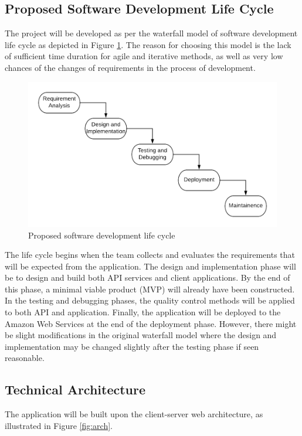 \documentclass[12pt, a4paper, oneside]{article}
\begin{document}
\subsection{Proposed Software Development Life Cycle}
The project will be developed as per the waterfall model of software development life cycle as depicted in Figure \ref{fig:sdlc}. The reason for choosing this model is the lack of sufficient time duration for agile and iterative methods, as well as very low chances of the changes of requirements in the process of development. 

\begin{figure}[h]
	\includegraphics[width=\linewidth]{sdlc}
	\centering
	\caption{Proposed software development life cycle}
	\label{fig:sdlc}
\end{figure}

The life cycle begins when the team collects and evaluates the requirements that will be expected from the application. The design and implementation phase will be to design and build both API services and client applications. By the end of this phase, a minimal viable product (MVP) will already have been constructed. In the testing and debugging phases, the quality control methods will be applied to both API and application. Finally, the application will be deployed to the Amazon Web Services at the end of the deployment phase. However, there might be slight modifications in the original waterfall model where the design and implementation may be changed slightly after the testing phase if seen reasonable.

\subsection{Technical Architecture}
The application will be built upon the client-server web architecture, as illustrated in Figure \ref{fig:arch}.
\end{document}
